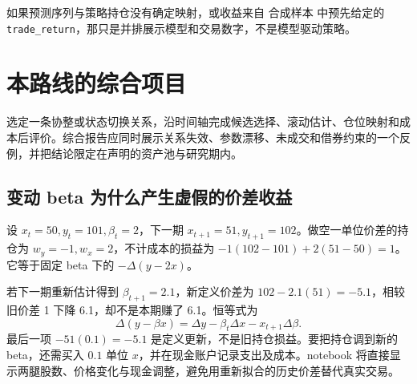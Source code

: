 \begin{diagnostic}
如果预测序列与策略持仓没有确定映射，或收益来自 合成样本 中预先给定的 \texttt{trade\_return}，那只是并排展示模型和交易数字，不是模型驱动策略。
\end{diagnostic}

\section{本路线的综合项目}

选定一条协整或状态切换关系，沿时间轴完成候选选择、滚动估计、仓位映射和成本后评价。综合报告应同时展示关系失效、参数漂移、未成交和借券约束的一个反例，并把结论限定在声明的资产池与研究期内。

\subsection{变动 beta 为什么产生虚假的价差收益}

设 $x_t=50,y_t=101,\beta_t=2$，下一期 $x_{t+1}=51,y_{t+1}=102$。做空一单位价差的持仓为 $w_y=-1,w_x=2$，不计成本的损益为 $-1(102-101)+2(51-50)=1$。它等于固定 beta 下的 $-\Delta(y-2x)$。

若下一期重新估计得到 $\beta_{t+1}=2.1$，新定义价差为 $102-2.1(51)=-5.1$，相较旧价差 1 下降 6.1，却不是本期赚了 6.1。恒等式为
\[
 \Delta(y-\beta x)=\Delta y-\beta_t\Delta x-x_{t+1}\Delta\beta.
\]
最后一项 $-51(0.1)=-5.1$ 是定义更新，不是旧持仓损益。要把持仓调到新的 beta，还需买入 $0.1$ 单位 $x$，并在现金账户记录支出及成本。notebook 将直接显示两腿股数、价格变化与现金调整，避免用重新拟合的历史价差替代真实交易。




